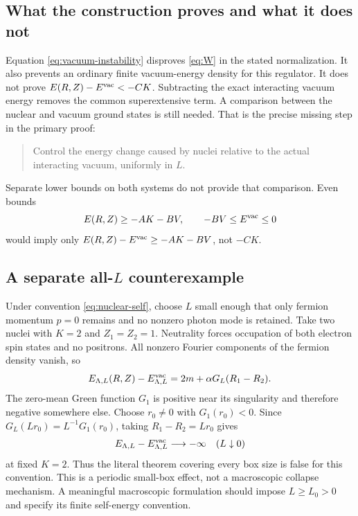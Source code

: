 \subsection{What the construction proves and what it does not}
Equation \eqref{eq:vacuum-instability} disproves \eqref{eq:W} in the stated
normalization. It also prevents an ordinary finite vacuum-energy density
for this regulator. It does not prove \(E(R,Z)-E^{\mathrm{vac}}<-CK\).
Subtracting the exact interacting vacuum energy removes the common
superextensive term. A comparison between the nuclear and vacuum ground
states is still needed.
That is the precise missing step in the primary proof:
\begin{quote}
Control the energy change caused by nuclei relative to the actual
interacting vacuum, uniformly in \(L\).
\end{quote}
Separate lower bounds on both systems do not provide that comparison.
Even bounds
\begin{equation}
E(R,Z)\ge-AK-BV,\qquad -BV\le E^{\mathrm{vac}}\le0
\end{equation}
would imply only \(E(R,Z)-E^{\mathrm{vac}}\ge-AK-BV\), not \(-CK\).

\subsection{A separate all-\texorpdfstring{\(L\)}{L} counterexample}
Under convention \eqref{eq:nuclear-self}, choose \(L\) small enough that
only fermion momentum \(p=0\) remains and no nonzero photon mode is retained.
Take two nuclei with \(K=2\) and \(Z_1=Z_2=1\).
Neutrality forces occupation of both electron spin states and no positrons.
All nonzero Fourier components of the fermion density vanish, so
\begin{equation}
E_{\Lambda,L}(R,Z)-E^{\mathrm{vac}}_{\Lambda,L}
=2m+\alpha G_L(R_1-R_2).
\label{eq:small-box}
\end{equation}
The zero-mean Green function \(G_1\) is positive near its singularity and
therefore negative somewhere else. Choose \(r_0\ne0\) with \(G_1(r_0)<0\).
Since \(G_L(Lr_0)=L^{-1}G_1(r_0)\), taking \(R_1-R_2=Lr_0\) gives
\begin{equation}
E_{\Lambda,L}-E^{\mathrm{vac}}_{\Lambda,L}\longrightarrow-\infty
\quad(L\downarrow0)
\end{equation}
at fixed \(K=2\).
Thus the literal theorem covering every box size is false for this
convention. This is a periodic small-box effect, not a macroscopic collapse
mechanism. A meaningful macroscopic formulation should impose
\(L\ge L_0>0\) and specify its finite self-energy convention.


